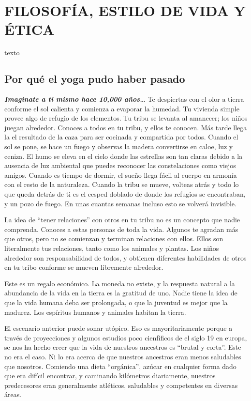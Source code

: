 \chapter{FILOSOFÍA, ESTILO DE VIDA Y ÉTICA}
texto
\section{Por qué el yoga pudo haber pasado}
\textbf{\textit{Imaginate a ti mismo hace 10,000 años\ldots}}
Te despiertas con el olor a tierra conforme el sol calienta y comienza a evaporar la humedad. Tu vivienda simple provee algo de refugio de los elementos. Tu tribu se levanta al amanecer; los niños juegan alrededor. Conoces a todos en tu tribu, y ellos te conocen. Más tarde llega la el resultado de la caza para ser cocinada y compartida por todos. Cuando el sol se pone, se hace un fuego y observas la madera convertirse en caloe, luz y ceniza. El humo se eleva en el cielo donde las estrellas son tan claras debido a la ausencia de luz ambiental que puedes reconocer las constelaciones como viejos amigos. Cuando es tiempo de dormir, el sueño llega fácil al cuerpo en armonía con el resto de la naturaleza. Cuando la tribu se mueve, volteas atrás y todo lo que queda detrás de ti es el cesped doblado de donde los refugios se encontraban, y un pozo de fuego. En unas cuantas semanas incluso esto se volverá invisible.

La idea de ``tener relaciones'' con otros en tu tribu no es un concepto que nadie comprenda. Conoces a estas personas de toda la vida. Algunos te agradan más que otros, pero no se comienzan y terminan relaciones con ellos. Ellos son literalmente tus relaciones, tanto como los animales y plantas. Los niños alrededor son responsabilidad de todos, y obtienen diferentes habilidades de otros en tu tribo conforme se mueven libremente alrededor.

Este es un regalo económico. La moneda no existe, y la respuesta natural a la abundancia de la vida en la tierra es la gratitud de uno. Nadie tiene la idea de que la vida humana deba ser prolongada, o que la juventud es mejor que la madurez. Los espíritus humanos y animales habitan la tierra.

El escenario anterior puede sonar utópico. Eso es mayoritariamente porque a trav\'es de proyecciones y algunos estudios poco cienfíficos de el siglo 19 en europa, se nos ha hecho creer que la vida de nuestros ancestros es ``brutal y corta''. Este no era el caso. Ni lo era acerca de que nuestros ancestros eran menos saludables que nosotros. Comiendo una dieta ``orgánica'', azúcar en cualquier forma dado que era difícil encontrar, y caminando kilómetros diariamente, nuestros predecesores eran generalmente atl\'eticos, saludables y competentes en diversas áreas.

